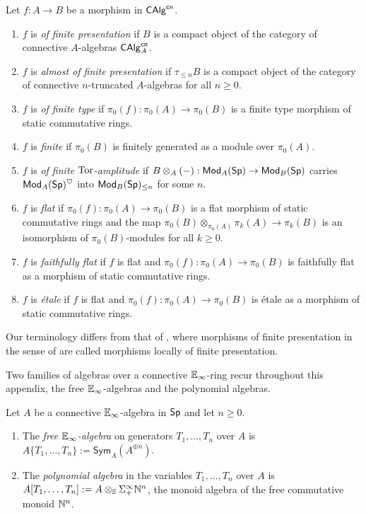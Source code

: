 \begin{definition}\label{def: finiteness conditions of morphisms}
    Let $f:A\to B$ be a morphism in $\mathsf{CAlg}^{\mathsf{cn}}$. 
    \begin{enumerate}
        \item $f$ is \emph{of finite presentation} if $B$ is a compact object of the category of connective $A$-algebras $\mathsf{CAlg}^{\mathsf{cn}}_{A}$. 
        \item $f$ is \emph{almost of finite presentation} if $\tau_{\leq n}B$ is a compact object of the category of connective $n$-truncated $A$-algebras for all $n\geq0$. 
        \item $f$ is \emph{of finite type} if $\pi_{0}(f):\pi_{0}(A)\to\pi_{0}(B)$ is a finite type morphism of static commutative rings. 
        \item $f$ is \emph{finite} if $\pi_{0}(B)$ is finitely generated as a module over $\pi_{0}(A)$. 
        \item $f$ is \emph{of finite $\mathrm{Tor}$-amplitude} if $B\otimes_{A}(-):\mathsf{Mod}_{A}(\mathsf{Sp})\to\mathsf{Mod}_{B}(\mathsf{Sp})$ carries $\mathsf{Mod}_{A}(\mathsf{Sp})^{\heartsuit}$ into $\mathsf{Mod}_{B}(\mathsf{Sp})_{\leq n}$ for some $n$.
        \item $f$ is \emph{flat} if $\pi_{0}(f):\pi_{0}(A)\to\pi_{0}(B)$ is a flat morphism of static commutative rings and the map $\pi_{0}(B)\otimes_{\pi_{0}(A)}\pi_{k}(A)\to\pi_{k}(B)$ is an isomorphism of $\pi_{0}(B)$-modules for all $k\geq0$. 
        \item $f$ is \emph{faithfully flat} if $f$ is flat and $\pi_{0}(f):\pi_{0}(A)\to\pi_{0}(B)$ is faithfully flat as a morphism of static commutative rings. 
        \item $f$ is \emph{\'{e}tale} if $f$ is flat and $\pi_{0}(f):\pi_{0}(A)\to\pi_{0}(B)$ is \'{e}tale as a morphism of static commutative rings. 
    \end{enumerate}
\end{definition}
\begin{remark}\label{rmk: terminology for finite presentation}
    Our terminology differs from that of \cite[\S 7.2.4]{HA}, where morphisms of finite presentation in the sense of  are called morphisms locally of finite presentation.
\end{remark}
Two families of algebras over a connective $\mathbb{E}_{\infty}$-ring recur throughout this appendix, the free $\mathbb{E}_{\infty}$-algebras and the polynomial algebras.
\begin{definition}\label{def: free and flat algebras}
    Let $A$ be a connective $\mathbb{E}_{\infty}$-algebra in $\mathsf{Sp}$ and let $n\geq 0$.
    \begin{enumerate}
        \item The \emph{free $\mathbb{E}_{\infty}$-algebra} on generators $T_{1},\dots,T_{n}$ over $A$ is $A\{T_{1},\dots,T_{n}\}:=\mathsf{Sym}_{A}(A^{\oplus n})$.
        \item The \emph{polynomial algebra} in the variables $T_{1},\dots,T_{n}$ over $A$ is $A[T_{1},\dots,T_{n}]:=A\otimes_{\mathbb{S}}\Sigma^{\infty}_{+}\mathbb{N}^{n}$, the monoid algebra of the free commutative monoid $\mathbb{N}^{n}$.
    \end{enumerate}
\end{definition}
